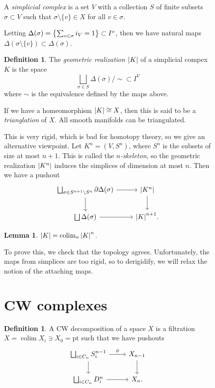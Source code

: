 \documentclass[leqno, openany]{memoir}
\newtheorem{lem}[thm]{Lemma}
\theoremstyle{definition}
\newtheorem{defn}[thm]{Definition}
\theoremstyle{remark}
\theoremstyle{plain}
\theoremstyle{definition}
\theoremstyle{remark}
\newcommand{\mr}[1]{\mathrm{#1}}
\begin{document}
\begin{figure}[H]
A \textit{simplicial complex} is a set $V$ with a collection $S$ of finite
subsets $\sigma \subset V$ such that $\sigma \setminus \{v \} \in X$ for all $v
\in \sigma$.

Letting $\Delta(\sigma) = \qty{\sum_{v \in \sigma} i_V = 1} \subset I^{v}$,
then we have natural maps $\Delta(\sigma \setminus \{v\}) \subset
\Delta(\sigma)$.

\begin{defn} The \textit{geometric realization} $\abs{K}$ of a simplicial
    compex $K$ is the space \[ \bigsqcup_{\sigma \in S} \Delta(\sigma) / \sim
    \subset I^V \] where $\sim$ is the equivalence defined by the maps above.
\end{defn}

If we have a homeomorphism $\abs{K} \cong X$, then this is said to be a
\textit{trianglation} of $X$. All smooth manifolds can be triangulated.

This is very rigid, which is bad for homotopy theory, so we give an alternative
viewpoint. Let $K^n = (V, S^n)$, where $S^n$ is the subsets of size at most
$n+1$. This is called the \textit{$n$-skeleton}, so the geometric realization
$\abs{K^n}$ induces the simplices of dimension at most $n$. Then we have a
pushout \begin{equation*} \begin{tikzcd} \bigsqcup_{\sigma \in S^{n+1}
\setminus S^n} \partial \Delta(\sigma) \arrow{r} \arrow{d} & \abs{K^n}
\arrow{d} \\ \bigsqcup \Delta(\sigma) \arrow{r} & \abs{K}^{n+1}.  \end{tikzcd}
\end{equation*}

\begin{lem} $\abs{K} = \operatorname{colim}_n \abs{K}^n$.  \end{lem} To prove
this, we check that the topology agrees. Unfortunately, the maps from simplices
are too rigid, so to derigidify, we will relax the notion of the attaching
maps.

\section{CW complexes}%

\begin{defn} A CW decomposition of a space $X$ is a filtration $X =
    \operatorname{colim} X_i \ni X_0 = \mr{pt}$ such that we have pushouts
    \begin{equation*} \begin{tikzcd} \bigsqcup_{i \in C_n} S_i^{n-1}
        \arrow{r}{\phi} \arrow{d} & X_{n-1} \arrow{d} \\ \bigsqcup_{i \in C_n}
    D_i^n \arrow{r} & X_n.  \end{tikzcd} \end{equation*}    \end{defn}


\end{figure}
\end{document}
